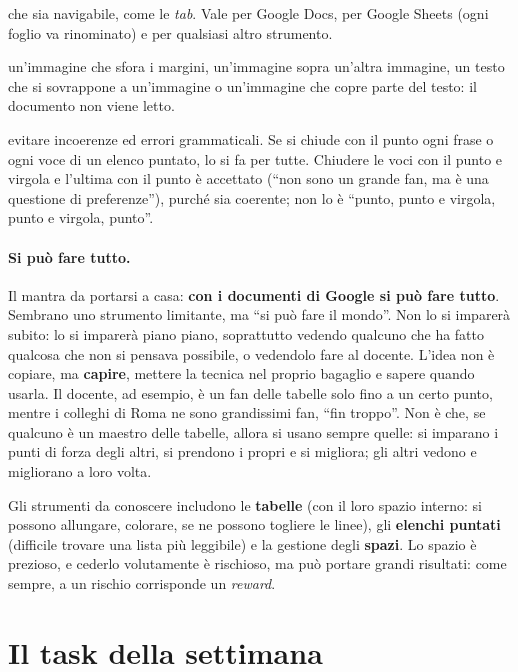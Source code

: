 \begin{description}
        che sia navigabile, come le \emph{tab}. Vale per Google Docs, per
        Google Sheets (ogni foglio va rinominato) e per qualsiasi altro
        strumento.
  \item[Margini e immagini] un'immagine che sfora i margini, un'immagine
        sopra un'altra immagine, un testo che si sovrappone a un'immagine o
        un'immagine che copre parte del testo: il documento non viene letto.
  \item[Coerenza] evitare incoerenze ed errori grammaticali. Se si chiude con
        il punto ogni frase o ogni voce di un elenco puntato, lo si fa per
        tutte. Chiudere le voci con il punto e virgola e l'ultima con il punto
        è accettato (``non sono un grande fan, ma è una questione di
        preferenze''), purché sia coerente; non lo è ``punto, punto e
        virgola, punto e virgola, punto''.
\end{description}

\paragraph{Si può fare tutto.} Il mantra da portarsi a casa:
\textbf{con i documenti di Google si può fare tutto}. Sembrano uno strumento
limitante, ma ``si può fare il mondo''. Non lo si imparerà subito: lo si
imparerà piano piano, soprattutto vedendo qualcuno che ha fatto qualcosa che
non si pensava possibile, o vedendolo fare al docente. L'idea non è copiare,
ma \textbf{capire}, mettere la tecnica nel proprio bagaglio e sapere quando
usarla. Il docente, ad esempio, è un fan delle tabelle solo fino a un certo
punto, mentre i colleghi di Roma ne sono grandissimi fan, ``fin troppo''. Non
è che, se qualcuno è un maestro delle tabelle, allora si usano sempre quelle:
si imparano i punti di forza degli altri, si prendono i propri e si migliora;
gli altri vedono e migliorano a loro volta.

Gli strumenti da conoscere includono le \textbf{tabelle} (con il loro spazio
interno: si possono allungare, colorare, se ne possono togliere le linee), gli
\textbf{elenchi puntati} (difficile trovare una lista più leggibile) e la
gestione degli \textbf{spazi}. Lo spazio è prezioso, e cederlo volutamente è
rischioso, ma può portare grandi risultati: come sempre, a un rischio
corrisponde un \emph{reward}.

\section{Il task della settimana}
\label{sec:task-gd3}

